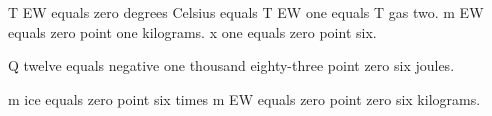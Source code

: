 T EW equals zero degrees Celsius equals T EW one equals T gas two.  
m EW equals zero point one kilograms.  
x one equals zero point six.  

Q twelve equals negative one thousand eighty-three point zero six joules.  

m ice equals zero point six times m EW equals zero point zero six kilograms.